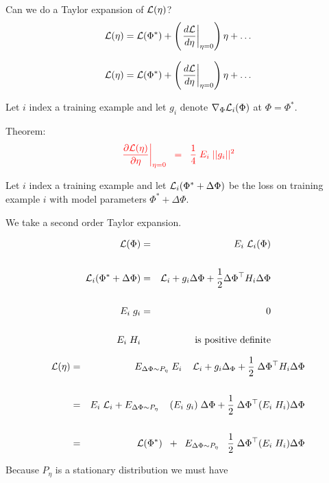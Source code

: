 {\vfill
Can we do a Taylor expansion of ${\cal L}(\eta)$?
$${\cal L}(\eta) = {\cal L}(\Phi^*) + \left(\left.\frac{d{\cal L}}{d \eta}\right|_{\eta = 0}\right)\eta + \ldots$$

$${\cal L}(\eta) = {\cal L}(\Phi^*) + \left(\left.\frac{d{\cal L}}{d \eta}\right|_{\eta = 0}\right)\eta + \ldots$$

\vfill
Let $i$ index a training example and let $g_i$ denote $\nabla_\Phi {\cal L}_i(\Phi)$ at $\Phi = \Phi^*$.

\vfill
Theorem:
$${\color{red} \left.\frac{\partial {\cal L}(\eta)}{\partial \eta}\right|_{\eta = 0} \;\;=\;\; \frac{1}{4}\; E_i\; ||g_i||^2}$$


\vfill
Let $i$ index a training example and let ${\cal L}_i(\Phi^* + \Delta \Phi)$ be the loss on training example $i$
with model parameters $\Phi^* + \Delta\Phi$. 

\vfill
We take a second order Taylor expansion.

\begin{eqnarray*}
{\cal L}(\Phi) & = & E_i\;{\cal L}_i(\Phi) \\
\\
{\cal L}_i(\Phi^* + \Delta \Phi) & = & {\cal L}_i + g_i \Delta \Phi + \frac{1}{2} \Delta\Phi^\top H_i \Delta\Phi \\
\\
E_i\; g_i & = & 0\\
\\
E_i\; H_i & & \mbox{is positive definite}
\end{eqnarray*}


\begin{eqnarray*}
{\cal L}(\eta) & = & \;\;\; E_{\Delta \Phi \sim P_\eta}\;E_i \;\;\;\; {\cal L}_i + g_i\Delta _\Phi + \frac{1}{2}\;\Delta \Phi^\top H_i \Delta \Phi \\
\\
& = & E_i\; {\cal L}_i + E_{\Delta \Phi \sim P_\eta} \;\;\;\;(E_i\;g_i) \;\Delta \Phi + \frac{1}{2}\;\Delta \Phi^\top (E_i\; H_i) \Delta \Phi \\
\\
& = & {\cal L}(\Phi^*)\;\; + \;\; E_{\Delta \Phi \sim P_\eta}\;\;\;\frac{1}{2}\;\Delta \Phi^\top (E_i\;H_i) \Delta \Phi
\end{eqnarray*}

Because $P_\eta$ is a stationary distribution we must have

}
